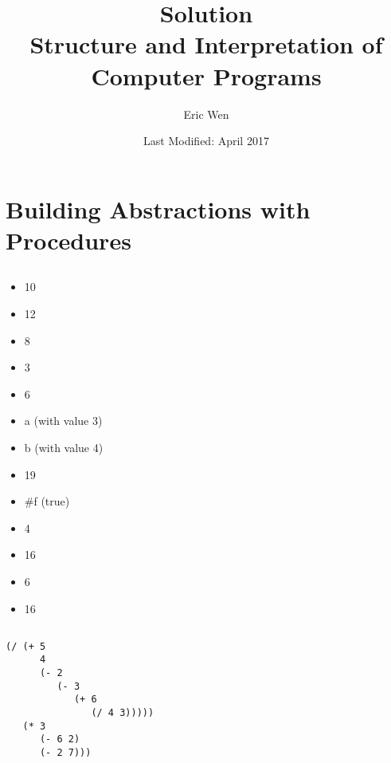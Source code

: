 \documentclass[a4paper]{report}
\begin{document}
\title{Solution \\
\large Structure and Interpretation of Computer Programs}
\author{Eric Wen}
\date{Last Modified: April 2017}
\maketitle

\begin{multicols}{2}
	\tableofcontents
\end{multicols}

%
%

\chapter{Building Abstractions with Procedures}


\section{}

\begin{multicols}{2}
	\begin{itemize}
		\item 10
		\item 12
		\item 8
		\item 3
		\item 6
		\item a (with value 3)
		\item b (with value 4)
		\item 19
		\item \#f (true)
		\item 4
		\item 16
		\item 6
		\item 16
	\end{itemize}
\end{multicols}


\section{}

\begin{lstlisting}
(/ (+ 5
      4
      (- 2
         (- 3
            (+ 6
               (/ 4 3)))))
   (* 3
      (- 6 2)
      (- 2 7)))
\end{lstlisting}
\end{document}
